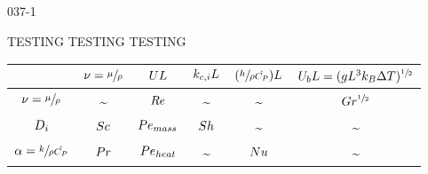 \begin{mitframe}{037-1}


TESTING TESTING TESTING

\begin{longtable}{ | c | c | c | c | c | c | } 
 \hline
     & $\freq = \sfrac{\chempot}{\dens}$
    & $\uvel\length$ 
    & $\masstranscoeff\length$ 
    & $(\sfrac{\planck}{\dens\hat{\cp}})\length$
    & $\uvel_{b}\length = (\grav\length^{3}\boltz\iipf\Temp)^{\sfrac{1}{2}}$
    \\
    \hline
   $\freq = \sfrac{\chempot}{\dens}$ & \textasciitilde & $\reynolds$ & \textasciitilde & \textasciitilde & $\grashof^{\sfrac{1}{2}}$ \\ \hline
    $\pdiff$ & $\schmidt$ & $\peclet_{mass}$ & $\sherwood$ & \textasciitilde & \textasciitilde \\ \hline    
    $\tdiff = \sfrac{\thermcond}{\dens\hat{\cp}}$ & $\prandtl$ & $\peclet_{heat}$ & \textasciitilde & $\nusselt$ & \textasciitilde \\ \hline   
 \hline 
 


\end{longtable}


\end{mitframe}